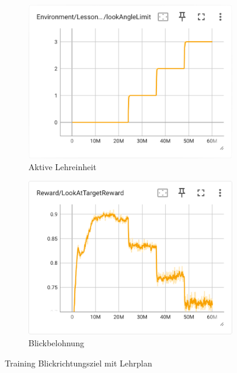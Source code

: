 \begin{figure}[H]
\begin{subfigure}{.49\textwidth}
      \centering  
      \includegraphics[width=\textwidth]{img/103_look_angle_limit}
      \caption{Aktive Lehreinheit}
      \label{fig:103_look_angle_limit}
    \end{subfigure}
     \begin{subfigure}{.49\textwidth}
      \centering  
      \includegraphics[width=\textwidth]{img/103_look_reward}
      \caption{Blickbelohnung}
      \label{fig:103_look_reward}
    \end{subfigure}
  \caption{Training Blickrichtungsziel mit Lehrplan}
  \label{fig:training_blickrichtungsziel_lehrplan}
\end{figure}

